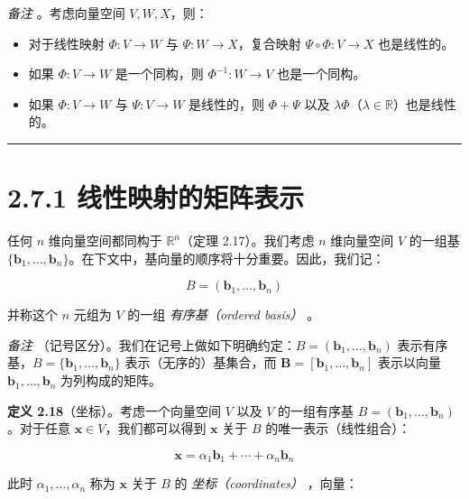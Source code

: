 \emph{备注} 。考虑向量空间 $ V, W, X $，则：

\begin{itemize}
\item 对于线性映射 $ \Phi : V \to W $ 与 $ \Psi : W \to X $，复合映射 $ \Psi \circ \Phi : V \to X $ 也是线性的。
\item 如果 $ \Phi : V \to W $ 是一个同构，则 $ \Phi^{-1} : W \to V $ 也是一个同构。
\item 如果 $ \Phi : V \to W $ 与 $ \Psi : V \to W $ 是线性的，则 $ \Phi + \Psi $ 以及 $ \lambda \Phi $（$ \lambda \in \mathbb{R} $）也是线性的。
\end{itemize}

\medskip\hrule\medskip

\section*{2.7.1 线性映射的矩阵表示}

任何 $ n $ 维向量空间都同构于 $ \mathbb{R}^n $（定理 2.17）。我们考虑 $ n $ 维向量空间 $ V $ 的一组基 $ \{\boldsymbol{b}_1, \ldots, \boldsymbol{b}_n\} $。在下文中，基向量的顺序将十分重要。因此，我们记：

\begin{equation}
B = (\boldsymbol{b}_1, \ldots, \boldsymbol{b}_n)
\tag{2.89}\label{eq:2-89}
\end{equation}

并称这个 $ n $ 元组为 $ V $ 的一组 \emph{有序基（ordered basis）} 。

\emph{备注} （记号区分）。我们在记号上做如下明确约定：$ B = (\boldsymbol{b}_1, \ldots, \boldsymbol{b}_n) $ 表示有序基，$ B = \{\boldsymbol{b}_1, \ldots, \boldsymbol{b}_n\} $ 表示（无序的）基集合，而 $ \boldsymbol{B} = [\boldsymbol{b}_1, \ldots, \boldsymbol{b}_n] $ 表示以向量 $ \boldsymbol{b}_1, \ldots, \boldsymbol{b}_n $ 为列构成的矩阵。

\textbf{定义 2.18}（坐标）。考虑一个向量空间 $ V $ 以及 $ V $ 的一组有序基 $ B = (\boldsymbol{b}_1, \ldots, \boldsymbol{b}_n) $。对于任意 $ \boldsymbol{x} \in V $，我们都可以得到 $ \boldsymbol{x} $ 关于 $ B $ 的唯一表示（线性组合）：

\begin{equation}
\boldsymbol{x} = \alpha_1 \boldsymbol{b}_1 + \cdots + \alpha_n \boldsymbol{b}_n
\tag{2.90}\label{eq:2-90}
\end{equation}

此时 $ \alpha_1, \ldots, \alpha_n $ 称为 $ \boldsymbol{x} $ 关于 $ B $ 的 \emph{坐标（coordinates）} ，向量：

